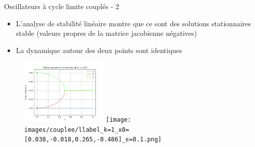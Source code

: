 
\begin{frame}{Oscillateurs à cycle limite couplés - 2}
  \begin{itemize}
    \item L'analyse de stabilité linéaire montre que ce sont des solutions stationnaires stable (valeurs propres de la matrice jacobienne négatives)
      \item La dynamique autour des deux points sont identiques
  \end{itemize}
  \begin{figure}
    \centering
    \includegraphics[width=0.37\textwidth]{images/couplee/title_Re_eigenvalues_eps=0.2.png}
    \hfill
    \texttt{[image: images/couplee/llabel\_k=1\_x0=[0.038,-0.018,0.265,-0.486]\_ϵ=0.1.png]}
\end{figure}
\end{frame}

